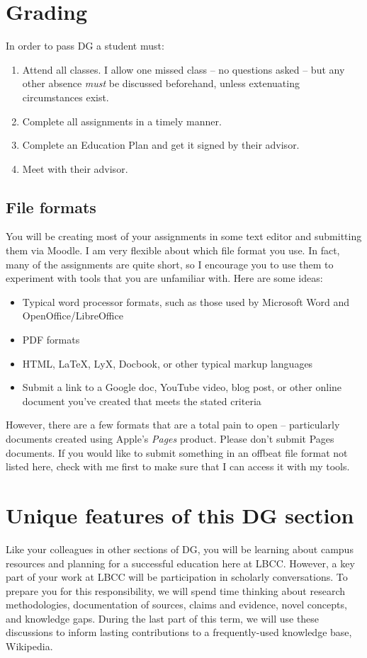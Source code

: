 \documentclass[12pt,article,oneside]{memoir}
\begin{document}
\section{Grading}

In order to pass DG a student must:

\begin{enumerate}
 \item Attend all classes.  I allow one missed class -- no questions asked -- but any other absence \emph{must} be discussed beforehand, unless extenuating circumstances exist.
 \item Complete all assignments in a timely manner.
 \item Complete an Education Plan and get it signed by their advisor.
 \item Meet with their advisor.
\end{enumerate}

  
\subsection{File formats}
You will be creating most of your assignments in some text editor and submitting them via Moodle.  I am very flexible about which file format you use. In fact, many of the assignments are quite short, so I encourage you to use them to experiment with tools that you are unfamiliar with.  Here are some ideas:
\begin{itemize}
 \item Typical word processor formats, such as those used by Microsoft Word and OpenOffice/LibreOffice
 \item PDF formats
 \item HTML, \LaTeX, LyX,  Docbook, or other typical markup languages
 \item Submit a link to a Google doc, YouTube video, blog post, or other online document you've created that meets the stated criteria 
\end{itemize}



However, there are a few formats that are a total pain to open -- particularly documents created using Apple's \emph{Pages} product.  Please don't submit Pages documents. If you would like to submit something in an offbeat file format not listed here, check with me first to make sure that I can access it with my tools.



\section{Unique features of this DG section}
Like your colleagues in other sections of DG, you will be learning about campus resources and planning for a successful education here at LBCC.  However, a key part of your work at LBCC will be participation in scholarly conversations.  To prepare you for this responsibility, we will spend time thinking about research methodologies, documentation of sources, claims and evidence, novel concepts, and knowledge gaps.  During the last part of this term, we will use these discussions to inform lasting contributions to a frequently-used knowledge base, Wikipedia.
\end{document}
